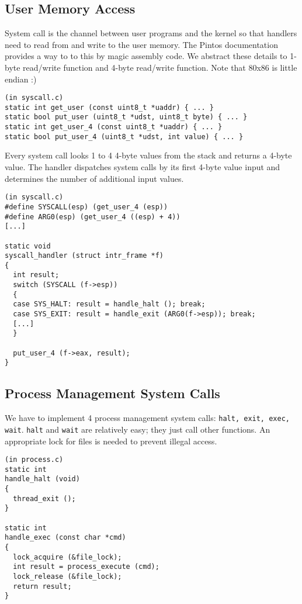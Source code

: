 \documentclass[a4paper,article,11pt,oneside]{article}
\begin{document}
\subsection{User Memory Access}
System call is the channel between user programs and the kernel so
that handlers need to read from and write to the user memory. The
Pintos documentation provides a way to to this by magic assembly
code. We abstract these details to 1-byte read/write function and
4-byte read/write function. Note that 80x86 is little endian :)
\begin{verbatim}
(in syscall.c)
static int get_user (const uint8_t *uaddr) { ... }
static bool put_user (uint8_t *udst, uint8_t byte) { ... }
static int get_user_4 (const uint8_t *uaddr) { ... }
static bool put_user_4 (uint8_t *udst, int value) { ... }
\end{verbatim}

Every system call looks 1 to 4 4-byte values from the stack and
returns a 4-byte value. The handler dispatches system calls by its
first 4-byte value input and determines the number of additional
input values.
\begin{verbatim}
(in syscall.c)
#define SYSCALL(esp) (get_user_4 (esp))
#define ARG0(esp) (get_user_4 ((esp) + 4))
[...]

static void
syscall_handler (struct intr_frame *f) 
{
  int result;
  switch (SYSCALL (f->esp))
  {
  case SYS_HALT: result = handle_halt (); break;
  case SYS_EXIT: result = handle_exit (ARG0(f->esp)); break;
  [...]
  }

  put_user_4 (f->eax, result);
}
\end{verbatim}

\subsection{Process Management System Calls}\label{secprocess}
We have to implement 4 process management system calls: \texttt{halt,
  exit, exec, wait}. \texttt{halt} and \texttt{wait} are relatively
easy; they just call other functions. An appropriate lock for files is
needed to prevent illegal access.

\begin{verbatim}
(in process.c)
static int
handle_halt (void)
{
  thread_exit ();
}

static int
handle_exec (const char *cmd)
{
  lock_acquire (&file_lock);
  int result = process_execute (cmd);
  lock_release (&file_lock);
  return result;
}
\end{verbatim}
\end{document}
